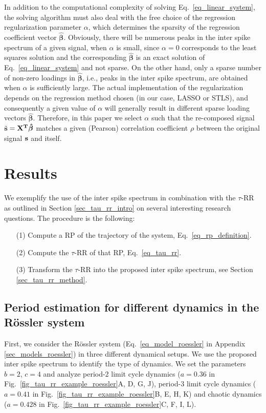 \documentclass[entropy,article,submit,pdftex,moreauthors]{Definitions/mdpi}
\begin{document}
In addition to the computational complexity of solving Eq.~\eqref{eq_linear_system}, the solving algorithm must also deal with the free choice of the regression regularization parameter $\alpha$, 
which determines the sparsity of the regression coefficient vector $\hat{\boldsymbol\beta}$. Obviously, there will be numerous peaks in the inter spike spectrum of a given signal, when $\alpha$ is small, 
since $\alpha=0$ corresponds to the least squares solution and the corresponding $\hat{\boldsymbol\beta}$ is an exact solution of Eq.~\ref{eq_linear_system} and not sparse. On the other hand, 
only a sparse number of non-zero loadings in $\hat{\boldsymbol\beta}$, i.e., peaks in the inter spike spectrum, are obtained when $\alpha$ is sufficiently large. 
The actual implementation of the regularization depends on the regression method chosen (in our case, LASSO or STLS), and consequently a given value of $\alpha$ will generally result in 
different sparse loading vectors $\hat{\boldsymbol\beta}$. Therefore, in this paper we select $\alpha$ such that the re-composed signal $\tilde{\bf{s}}=\bf{X}^T\hat{\boldsymbol\beta}$ matches a 
given (Pearson) correlation coefficient $\rho$ between the original signal $\bf{s}$ and itself.

\section{Results}\label{sec_tau_rr_application}

We exemplify the use of the inter spike spectrum in combination with the $\tau$-RR as outlined in 
Section \ref{sec_tau_rr_intro} on several interesting research questions. The procedure is the following:
\begin{itemize}[noitemsep]
\item[(1)] Compute a RP of the trajectory of the system, Eq.~\eqref{eq_rp_definition}. 
\item[(2)] Compute the $\tau$-RR of that RP, Eq.~\eqref{eq_tau_rr}.
\item[(3)] Transform the $\tau$-RR into the proposed inter spike spectrum, see Section \ref{sec_tau_rr_method}.
\end{itemize}

\subsection{Period estimation for different dynamics in the R\"ossler system}
First, we consider the R\"ossler system (Eq.~\eqref{eq_model_roessler} in Appendix \ref{sec_models_roessler}) 
in three different dynamical setups. We use the proposed inter spike spectrum to
identify the type of dynamics.
We set the parameters $b=2$, $c=4$ and analyze period-2 limit cycle dynamics ($a=0.36$ in Fig.~\ref{fig_tau_rr_example_roessler}A, D, G, J), 
period-3 limit cycle dynamics ($a=0.41$ in Fig.~\ref{fig_tau_rr_example_roessler}B, E, H, K) and chaotic dynamics ($a=0.428$ in Fig.~\ref{fig_tau_rr_example_roessler}C, F, I, L).  
\end{document}
